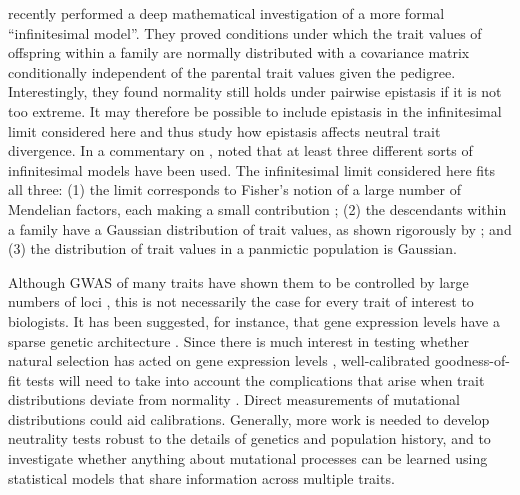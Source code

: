 \citet{Barton2017} recently performed a deep mathematical investigation of a
more formal ``infinitesimal model''. They proved conditions under which the
trait values of offspring within a family are normally distributed with a
covariance matrix conditionally independent of the parental trait values given
the pedigree. Interestingly, they found normality still holds under pairwise
epistasis if it is not too extreme. It may therefore be possible to include
epistasis in the infinitesimal limit considered here and thus study how
epistasis affects neutral trait divergence. In a commentary on
\citet{Barton2017}, \citet{Turelli2017} noted that at least three
different sorts of infinitesimal models have been used. The infinitesimal limit
considered here fits all three: (1) the limit corresponds to Fisher's notion of
a large number of Mendelian factors, each making a small contribution
\citep{Fisher1918}; (2) the descendants within a family have a Gaussian
distribution of trait values, as shown rigorously by \citet{Barton2017}; and (3)
the distribution of trait values in a panmictic population is Gaussian.

Although GWAS of many traits have shown them to be controlled by large numbers
of loci \citep{Boyle2017}, this is not necessarily the case for every trait of
interest to biologists. It has been suggested, for instance, that gene
expression levels have a sparse genetic architecture \citep{Wheeler2016}. Since
there is much interest in testing whether natural selection has acted on gene
expression levels \citep{Whitehead2006,Gilad2006,Yang2017}, well-calibrated
goodness-of-fit tests will need to take into account the complications that
arise when trait distributions deviate from normality \citep{Khaitovich2005}.
Direct measurements of mutational distributions \citep{Gruber2012,Metzger2016}
could aid calibrations. Generally, more work is needed to develop neutrality
tests robust to the details of genetics and population history, and to
investigate whether anything about mutational processes can be learned using
statistical models that share information across multiple traits.

